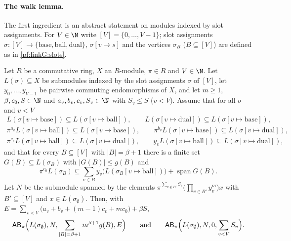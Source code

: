 \paragraph{The walk lemma.}
The first ingredient is an abstract statement on modules indexed by slot assignments. For $V\in\N$ write
$[V]=\{0,\dots,V-1\}$; slot assignments $\sigma:[V]\to\{\mathrm{base},\mathrm{ball},\mathrm{dual}\}$, $\sigma[v\mapsto s]$ and
the vertices $\sigma_B$ ($B\subseteq[V]$) are defined as in \cref{pf:linkG:slots}.

\begin{theorem}\label{pf:linkG:walkabs}
Let $R$ be a commutative ring, $X$ an $R$-module, $\pi\in R$ and $V\in\N$. Let $L(\sigma)\subseteq X$ be submodules indexed by
the slot assignments $\sigma$ of $[V]$, let $y_0,\dots,y_{V-1}$ be pairwise commuting endomorphisms of $X$, and let $m\ge1$,
$\beta,c_0,S\in\N$ and $a_v,b_v,c_v,S_v\in\N$ with $S_v\le S$ ($v<V$). Assume that for all $\sigma$ and $v<V$
\begin{gather*}
L(\sigma[v\mapsto\mathrm{base}])\subseteq L(\sigma[v\mapsto\mathrm{ball}]),\qquad
L(\sigma[v\mapsto\mathrm{dual}])\subseteq L(\sigma[v\mapsto\mathrm{base}]),\\
\pi^{a_v}L(\sigma[v\mapsto\mathrm{ball}])\subseteq L(\sigma[v\mapsto\mathrm{base}]),\qquad
\pi^{b_v}L(\sigma[v\mapsto\mathrm{base}])\subseteq L(\sigma[v\mapsto\mathrm{dual}]),\\
\pi^{c_v}L(\sigma[v\mapsto\mathrm{ball}])\subseteq L(\sigma[v\mapsto\mathrm{dual}]),\qquad
y_vL(\sigma[v\mapsto\mathrm{ball}])\subseteq L(\sigma[v\mapsto\mathrm{dual}]),
\end{gather*}
and that for every $B\subseteq[V]$ with $|B|=\beta+1$ there is a finite set $G(B)\subseteq L(\sigma_B)$ with $|G(B)|\le
g(B)$ and
\[
\pi^{c_0}L(\sigma_B)\subseteq\sum_{v\in B}y_v\bigl(L(\sigma_B[v\mapsto\mathrm{ball}])\bigr)+\operatorname{span}G(B).
\]
Let $N$ be the submodule spanned by the elements $\pi^{\sum_{v\notin B'}S_v}\bigl(\prod_{v\in B'}y_v^m\bigr)x$ with
$B'\subseteq[V]$ and $x\in L(\sigma_\emptyset)$. Then, with $E=\sum_{v<V}\bigl(a_v+b_v+(m-1)c_v+mc_0\bigr)+\beta S$,
\[
\mathsf{AB}_\pi\Bigl(L(\sigma_\emptyset),N,\sum_{|B|=\beta+1}m^{\beta+1}g(B),E\Bigr)\qquad\text{and}\qquad
\mathsf{AB}_\pi\Bigl(L(\sigma_\emptyset),N,0,\sum_{v<V}S_v\Bigr).
\]
\end{theorem}

